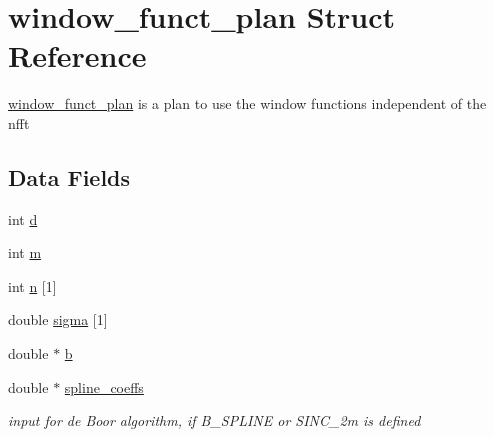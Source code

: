 \hypertarget{structwindow__funct__plan}{
\section{window\_\-funct\_\-plan Struct Reference}
\label{structwindow__funct__plan}
}
\hyperlink{structwindow__funct__plan}{window\_\-funct\_\-plan} is a plan to use the window functions independent of the nfft  


\subsection*{Data Fields}
\begin{CompactItemize}
\item 
\hypertarget{structwindow__funct__plan_c4295c905fdb548e391524d45b90906a}{
int \hyperlink{structwindow__funct__plan_c4295c905fdb548e391524d45b90906a}{d}}
\label{structwindow__funct__plan_c4295c905fdb548e391524d45b90906a}

\item 
\hypertarget{structwindow__funct__plan_3e0b8b1c77076cee7875ba4f0c56573d}{
int \hyperlink{structwindow__funct__plan_3e0b8b1c77076cee7875ba4f0c56573d}{m}}
\label{structwindow__funct__plan_3e0b8b1c77076cee7875ba4f0c56573d}

\item 
\hypertarget{structwindow__funct__plan_1361ada94e81d0dbd531432f633cc930}{
int \hyperlink{structwindow__funct__plan_1361ada94e81d0dbd531432f633cc930}{n} \mbox{[}1\mbox{]}}
\label{structwindow__funct__plan_1361ada94e81d0dbd531432f633cc930}

\item 
\hypertarget{structwindow__funct__plan_4c725a90fdff38caf38c3c4af49c495d}{
double \hyperlink{structwindow__funct__plan_4c725a90fdff38caf38c3c4af49c495d}{sigma} \mbox{[}1\mbox{]}}
\label{structwindow__funct__plan_4c725a90fdff38caf38c3c4af49c495d}

\item 
\hypertarget{structwindow__funct__plan_9f9b84a5bb09b060d373dc85e9b21367}{
double $\ast$ \hyperlink{structwindow__funct__plan_9f9b84a5bb09b060d373dc85e9b21367}{b}}
\label{structwindow__funct__plan_9f9b84a5bb09b060d373dc85e9b21367}

\item 
\hypertarget{structwindow__funct__plan_40bfa003da99cdef3cc9db0baf11130e}{
double $\ast$ \hyperlink{structwindow__funct__plan_40bfa003da99cdef3cc9db0baf11130e}{spline\_\-coeffs}}
\label{structwindow__funct__plan_40bfa003da99cdef3cc9db0baf11130e}

\begin{CompactList}\small\item\em input for de Boor algorithm, if B\_\-SPLINE or SINC\_\-2m is defined \item\end{CompactList}\end{CompactItemize}


